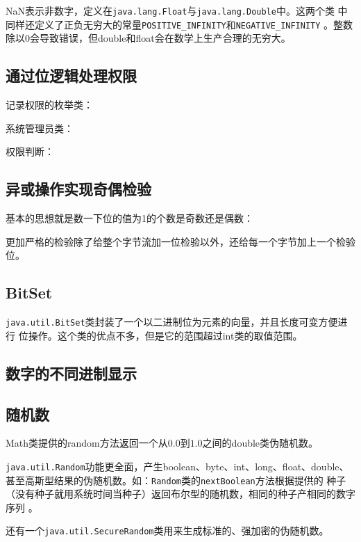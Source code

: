 NaN表示非数字，定义在\verb|java.lang.Float|与\verb|java.lang.Double|中。这两个类
中同样还定义了正负无穷大的常量\verb|POSITIVE_INFINITY|和\verb|NEGATIVE_INFINITY|
。整数除以0会导致错误，但double和float会在数学上生产合理的无穷大。





\subsection{通过位逻辑处理权限}

记录权限的枚举类：



系统管理员类：



权限判断：





\subsection{异或操作实现奇偶检验}

基本的思想就是数一下位的值为1的个数是奇数还是偶数：



更加严格的检验除了给整个字节流加一位检验以外，还给每一个字节加上一个检验位。



\subsection{BitSet}

\verb|java.util.BitSet|类封装了一个以二进制位为元素的向量，并且长度可变方便进行
位操作。这个类的优点不多，但是它的范围超过int类的取值范围。



\subsection{数字的不同进制显示}





\subsection{随机数}

Math类提供的random方法返回一个从$0.0$到$1.0$之间的double类伪随机数。

\verb|java.util.Random|功能更全面，产生boolean、byte、int、long、float、double、
甚至高斯型结果的伪随机数。如：\verb|Random|类的\verb|nextBoolean|方法根据提供的
种子（没有种子就用系统时间当种子）返回布尔型的随机数，相同的种子产相同的数字序列
。

还有一个\verb|java.util.SecureRandom|类用来生成标准的、强加密的伪随机数。







